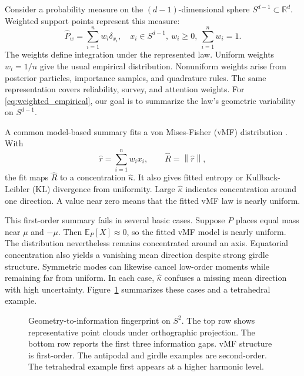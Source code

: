 \documentclass[twoside]{article}
\theoremstyle{definition}
\theoremstyle{remark}
\newcommand{\E}{\mathbb E}
\newcommand{\norm}[1]{\left\lVert #1\right\rVert}
\begin{document}
Consider a probability measure on the $(d-1)$-dimensional sphere $S^{d-1}\subset\mathbb{R}^d$. Weighted support points represent this measure:
\begin{equation}
  \widehat P_w = \sum_{i=1}^n w_i \delta_{x_i},
  \quad x_i\in S^{d-1},~w_i\ge 0,~\sum_{i=1}^n w_i=1.
  \label{eq:weighted_empirical}
\end{equation}
The weights define integration under the represented law. Uniform weights $w_i=1/n$ give the usual empirical distribution. Nonuniform weights arise from posterior particles, importance samples, and quadrature rules. The same representation covers reliability, survey, and attention weights. For \eqref{eq:weighted_empirical}, our goal is to summarize the law's geometric variability on $S^{d-1}$.

A common model-based summary fits a von Mises-Fisher (vMF) distribution \citep{fisher_1953_DispersionSphere}. With
\[
  \widehat r=\sum_{i=1}^n w_i x_i,
  \qquad \widehat R=\norm{\widehat r},
\]
the fit maps $\widehat R$ to a concentration $\widehat\kappa$. It also gives fitted entropy or Kullback-Leibler (KL) divergence from uniformity. Large $\widehat\kappa$ indicates concentration around one direction. A value near zero means that the fitted vMF law is nearly uniform.

This first-order summary fails in several basic cases. Suppose $P$ places equal mass near $\mu$ and $-\mu$. Then $\E_P[X]\approx0$, so the fitted vMF model is nearly uniform. The distribution nevertheless remains concentrated around an axis. Equatorial concentration also yields a vanishing mean direction despite strong girdle structure. Symmetric modes can likewise cancel low-order moments while remaining far from uniform. In each case, $\widehat\kappa$ confuses a missing mean direction with high uncertainty. Figure~\ref{fig:hero} summarizes these cases and a tetrahedral example.

\begin{figure}[t]
\centering

\caption{Geometry-to-information fingerprint on $S^2$. The top row shows representative point clouds under orthographic projection. The bottom row reports the first three information gaps. vMF structure is first-order. The antipodal and girdle examples are second-order. The tetrahedral example first appears at a higher harmonic level.}
\label{fig:hero}
\end{figure}
\end{document}
